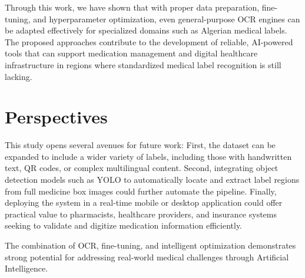 Through this work, we have shown that with proper data preparation, fine-tuning, and hyperparameter optimization, even general-purpose OCR engines can be adapted effectively for specialized domains such as Algerian medical labels. The proposed approaches contribute to the development of reliable, AI-powered tools that can support medication management and digital healthcare infrastructure in regions where standardized medical label recognition is still lacking.

\section*{Perspectives}

This study opens several avenues for future work:
First, the dataset can be expanded to include a wider variety of labels, including those with handwritten text, QR codes, or complex multilingual content. Second, integrating object detection models such as YOLO to automatically locate and extract label regions from full medicine box images could further automate the pipeline. Finally, deploying the system in a real-time mobile or desktop application could offer practical value to pharmacists, healthcare providers, and insurance systems seeking to validate and digitize medication information efficiently.

The combination of OCR, fine-tuning, and intelligent optimization demonstrates strong potential for addressing real-world medical challenges through Artificial Intelligence.
